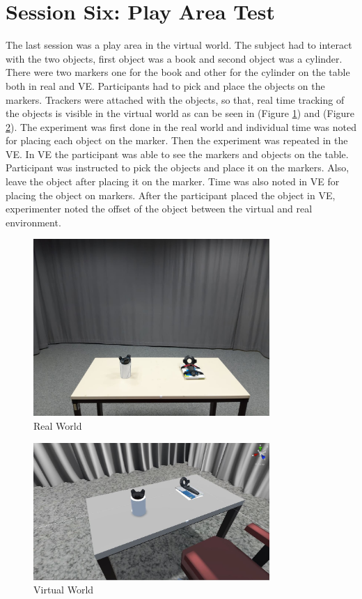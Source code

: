 \section{Session Six: Play Area Test}
The last session was a play area in the virtual world. The subject had to interact with the two objects, first object was a book and second object was a cylinder. There were two markers one for the book and other for the cylinder on the table both in real and VE. Participants had to pick and place the objects on the markers. Trackers were attached with the objects, so that, real time tracking of the objects is visible in the virtual world as can be seen in (Figure \ref{fig:fig81}) and (Figure \ref{fig:fig8}). The experiment was first done in the real world and individual time was noted for placing each object on the marker. Then the experiment was repeated in the VE. In VE the participant was able to see the markers and objects on the table. Participant was instructed to pick the objects and place it on the markers. Also, leave the object after placing it on the marker. Time was also noted in VE for placing the object on markers. After the participant placed the object in VE, experimenter noted the offset of the object between the virtual and real environment. 

\begin{figure}[h]
    \centering
    \includegraphics[width=0.8\textwidth]{./images/fig81.jpeg}
    \caption{Real World}
    \label{fig:fig81}
\end{figure}
\begin{figure}[h]
    \centering
    \includegraphics[width=0.8\textwidth]{./images/fig8.jpeg}
    \caption{Virtual World}
    \label{fig:fig8}
\end{figure}

